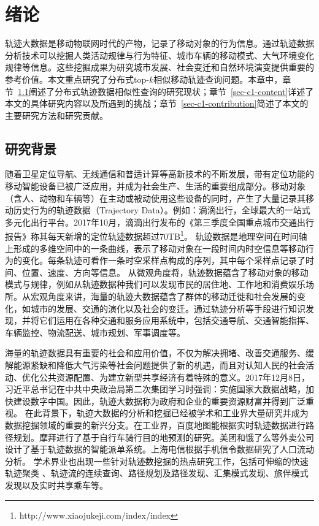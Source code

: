 \chapter{绪论}\label{capater:intro}
轨迹大数据是移动物联网时代的产物，记录了移动对象的行为信息。通过轨迹数据分析技术可以挖掘人类活动规律与行为特征、城市车辆的移动模式、大气环境变化规律等信息。这些挖掘成果为研究城市发展、社会变迁和自然环境演变提供重要的参考价值。本文重点研究了分布式top-$k$相似移动轨迹查询问题。本章中，章节~\ref{sec-c1-background}阐述了分布式轨迹数据相似性查询的研究现状；章节~\ref{sec-c1-content}详述了本文的具体研究内容以及所遇到的挑战；章节~\ref{sec-c1-contribution}简述了本文的主要研究方法和研究贡献。

\section{研究背景}\label{sec-c1-background}
        随着卫星定位导航、无线通信和普适计算等高新技术的不断发展，带有定位功能的移动智能设备已被广泛应用，并成为社会生产、生活的重要组成部分。移动对象（含人、动物和车辆等）在主动或被动使用这些设备的同时，产生了大量记录其移动历史行为的轨迹数据（Trajectory Data）。例如：滴滴出行，全球最大的一站式多元化出行平台。2017年10月，滴滴出行发布的《第三季度全国重点城市交通出行报告》称其每天新增的定位轨迹数据超过70TB\footnote{http://www.xiaojukeji.com/index/index}。
            轨迹数据是地理空间在时间轴上形成的多维空间中的一条曲线，表示了移动对象在一段时间内时空信息等移动行为的变化。每条轨迹可看作一条时空采样点构成的序列，其中每个采样点记录了时间、位置、速度、方向等信息。 从微观角度将，轨迹数据蕴含了移动对象的移动模式与规律，例如从轨迹数据种我们可以发现市民的居住地、工作地和消费娱乐场所。从宏观角度来讲，海量的轨迹大数据蕴含了群体的移动迁徙和社会发展的变化，如城市的发展、交通的演化以及社会的变迁。通过轨迹分析等手段进行知识发现，并将它们运用在各种交通和服务应用系统中，包括交通导航、交通智能指挥、车辆监控、物流配送、城市规划、军事调度等。
        
         海量的轨迹数据具有重要的社会和应用价值，不仅为解决拥堵、改善交通服务、缓解能源紧缺和降低大气污染等社会问题提供了新的机遇，而且对认知人民的社会活动、优化公共资源配置、为建立新型共享经济有着特殊的意义。2017年12月8日，习近平总书记在中共中央政治局第二次集团学习时强调：实施国家大数据战略，加快建设数字中国。因此，轨迹大数据称为政府和企业的重要资源财富并得到广泛重视。
         在此背景下，轨迹大数据的分析和挖掘已经被学术和工业界大量研究并成为数据挖掘领域的重要的新兴分支。在工业界，百度地图能根据实时轨迹数据进行路径规划。摩拜进行了基于自行车骑行目的地预测的研究。美团和饿了么等外卖公司设计了基于轨迹数据的智能派单系统。上海电信根据手机信令数据研究了人口流动分析。
         学术界业也出现一些针对轨迹数挖掘的热点研究工作，包括可伸缩的快速轨迹聚类 \cite{DengHZHD15,CostaMM14,YuWWWH13,MaoSJZZ16}、轨迹流的连续查询\cite{NehmeR06}、路径规划及路径发现\cite{SacharidisPTKPMS08}、汇集模式发现\cite{ZhengZYS13}、旅伴模式发现\cite{TangZYHLHP12,LiCJT13}以及实时共享乘车\cite{DuanJWZY16}等。 
         
